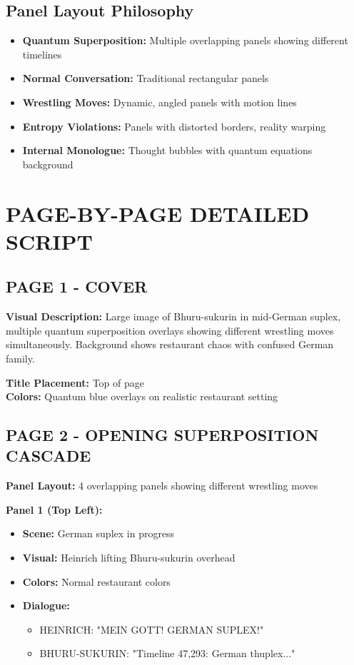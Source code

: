 \documentclass[12pt,a4paper]{article}
\begin{document}
\subsection{Panel Layout Philosophy}
\begin{itemize}
\item \textbf{Quantum Superposition:} Multiple overlapping panels showing different timelines
\item \textbf{Normal Conversation:} Traditional rectangular panels
\item \textbf{Wrestling Moves:} Dynamic, angled panels with motion lines
\item \textbf{Entropy Violations:} Panels with distorted borders, reality warping
\item \textbf{Internal Monologue:} Thought bubbles with quantum equations background
\end{itemize}

\section{PAGE-BY-PAGE DETAILED SCRIPT}

\subsection{PAGE 1 - COVER}
\textbf{Visual Description:}
Large image of Bhuru-sukurin in mid-German suplex, multiple quantum superposition overlays showing different wrestling moves simultaneously. Background shows restaurant chaos with confused German family.

\textbf{Title Placement:} Top of page\\
\textbf{Colors:} Quantum blue overlays on realistic restaurant setting

\subsection{PAGE 2 - OPENING SUPERPOSITION CASCADE}

\textbf{Panel Layout:} 4 overlapping panels showing different wrestling moves

\textbf{Panel 1 (Top Left):}
\begin{itemize}
\item \textbf{Scene:} German suplex in progress
\item \textbf{Visual:} Heinrich lifting Bhuru-sukurin overhead
\item \textbf{Colors:} Normal restaurant colors
\item \textbf{Dialogue:}
\begin{itemize}
\item HEINRICH: "MEIN GOTT! GERMAN SUPLEX!"
\item BHURU-SUKURIN: "Timeline 47,293: German thuplex..."
\end{itemize}
\end{itemize}
\end{document}

